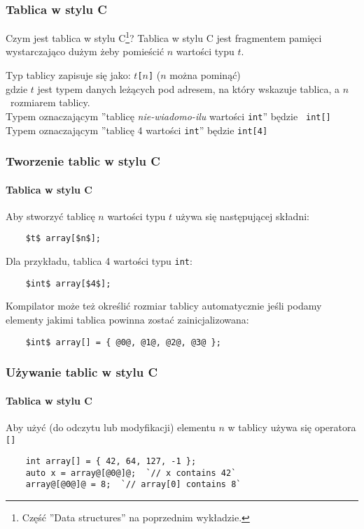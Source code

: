 \documentclass[aspectratio=169]{beamer}
\begin{document}
\begin{frame}
    \frametitle{Tablica w stylu C}

    Czym jest tablica w stylu C\footnote{Część ''Data structures'' na poprzednim
    wykładzie.}? Tablica w stylu C jest fragmentem pamięci wystarczająco
    dużym żeby pomieścić $n$ wartości typu $t$.
    \label{what_is_a_c_style_array}

    \vspace{1em}

    Typ tablicy zapisuje się jako: {\tt $t$[$n$]} ($n$ można pominąć)\\
    gdzie $t$ jest typem danych leżących pod adresem, na który wskazuje tablica,
    a $n$~rozmiarem tablicy.\\
    Typem oznaczającym ''tablicę \emph{nie-wiadomo-ilu} wartości {\tt int}'' będzie {\tt
    int[]}\\
    Typem oznaczającym ''tablicę 4 wartości {\tt int}'' będzie {\tt int[4]}
\end{frame}

\begin{frame}[fragile]
    \frametitle{Tworzenie tablic w stylu C}
    \framesubtitle{Tablica w stylu C}

    Aby stworzyć tablicę $n$ wartości typu $t$ używa się następującej składni:

    \begin{lstlisting}
    $t$ array[$n$];
    \end{lstlisting}

    Dla przykładu, tablica 4 wartości typu {\tt int}:

    \begin{lstlisting}
    $int$ array[$4$];
    \end{lstlisting}

    Kompilator może też określić rozmiar tablicy automatycznie jeśli podamy
    elementy jakimi tablica powinna zostać zainicjalizowana:

    \begin{lstlisting}
    $int$ array[] = { @0@, @1@, @2@, @3@ };
    \end{lstlisting}
\end{frame}

\begin{frame}[fragile]
    \frametitle{Używanie tablic w stylu C}
    \framesubtitle{Tablica w stylu C}

    Aby użyć (do odczytu lub modyfikacji) elementu $n$ w tablicy używa się
    operatora {\tt []}

    \begin{lstlisting}
    int array[] = { 42, 64, 127, -1 };
    auto x = array@[@0@]@;  `// x contains 42`
    array@[@0@]@ = 8;  `// array[0] contains 8`
    \end{lstlisting}
\end{frame}
\end{document}
